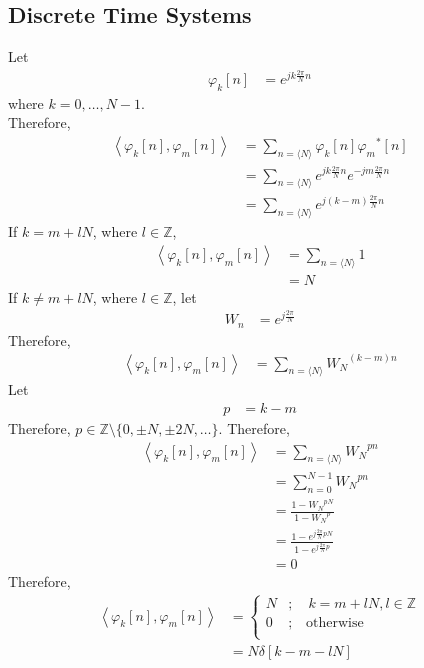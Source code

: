 \documentclass[titlepage, fleqn, a4paper, 12pt, twoside]{article}
\theoremstyle{definition}
\theoremstyle{theorem}
\begin{document}
\subsection{Discrete Time Systems}

Let
\begin{align*}
	\varphi_k[n] &= e^{j k \frac{2 \pi}{N} n}
\end{align*}
where $k = 0,\dots,N - 1$.\\
Therefore,
\begin{align*}
	\left\langle \varphi_k[n],\varphi_m[n] \right\rangle &= \sum\limits_{n = \langle N \rangle} \varphi_k[n] {\varphi_m}^*[n]\\
	&= \sum\limits_{n = \langle N \rangle} e^{j k \frac{2 \pi}{N} n} e^{-j m \frac{2 \pi}{N} n}\\
	&= \sum\limits_{n = \langle N \rangle} e^{j (k - m) \frac{2 \pi}{N} n}
\end{align*}
If $k = m + l N$, where $l \in \mathbb{Z}$,
\begin{align*}
	\left\langle \varphi_k[n],\varphi_m[n] \right\rangle &= \sum\limits_{n = \langle N \rangle} 1\\
	&= N
\end{align*}
If $k \neq m + l N$, where $l \in \mathbb{Z}$, let
\begin{align*}
	W_n &= e^{j \frac{2 \pi}{N}}
\end{align*}
Therefore,
\begin{align*}
	\left\langle \varphi_k[n],\varphi_m[n] \right\rangle &= \sum\limits_{n = \langle N \rangle} {W_N}^{(k - m) n}
\end{align*}
Let
\begin{align*}
	p &= k - m
\end{align*}
Therefore, $p \in \mathbb{Z} \setminus \{0,\pm N,\pm 2 N,\dots\}$.
Therefore,
\begin{align*}
	\left\langle \varphi_k[n],\varphi_m[n] \right\rangle &= \sum\limits_{n = \langle N \rangle} {W_N}^{p n}\\
	&= \sum\limits_{n = 0}^{N - 1} {W_N}^{p n}\\
	&= \frac{1 - {W_N}^{p N}}{1 - {W_N}^p}\\
	&= \frac{1 - e^{j \frac{2 \pi}{N} p N}}{1 - e^{j \frac{2 \pi}{N} p}}\\
	&= 0
\end{align*}
Therefore,
\begin{align*}
	\left\langle \varphi_k[n],\varphi_m[n] \right\rangle &=
		\begin{cases}
			N &;\quad k = m + l N, l \in \mathbb{Z}\\
			0 &;\quad \text{otherwise}\\
		\end{cases}\\
		&= N \delta[k - m - l N]
\end{align*}
\end{document}
